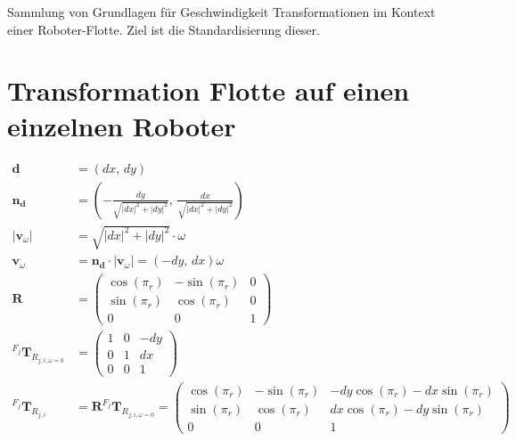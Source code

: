 \documentclass{article}
\newcommand{\Transform}[2]{^{#1}\textbf{T}_{#2}}
\begin{document}
Sammlung von Grundlagen für Geschwindigkeit Transformationen im Kontext einer Roboter-Flotte. Ziel ist die Standardisierung dieser.

\section*{Transformation Flotte auf einen einzelnen Roboter}

\begin{align}
    \textbf{d} &= \left(\mathit{dx},\,\mathit{dy}\right) \\
    \textbf{n}_\textbf{d} &= \left(-\frac{\mathit{dy}}{\sqrt{{\left| \mathit{dx} \right|}^{2} + {\left| \mathit{dy} \right|}^{2}}},\,\frac{\mathit{dx}}{\sqrt{{\left| \mathit{dx} \right|}^{2} + {\left| \mathit{dy} \right|}^{2}}}\right) \\
    \left|\textbf{v}_\omega\right| &= \sqrt{{\left| \mathit{dx} \right|}^{2} + {\left| \mathit{dy} \right|}^{2}} \cdot \omega \\
    \textbf{v}_\omega &= \textbf{n}_\textbf{d} \cdot \left|\textbf{v}_\omega\right| = \left(-\mathit{dy},\,\mathit{dx}\right) \omega \\
    \textbf{R} &= \left(\begin{array}{rrr}
        \cos\left(\pi_{r}\right) & -\sin\left(\pi_{r}\right) & 0 \\
        \sin\left(\pi_{r}\right) & \cos\left(\pi_{r}\right) & 0 \\
        0 & 0 & 1
    \end{array}\right) \\
    \Transform{F_j}{R_{j,i,\omega=0}} &= \left(\begin{array}{rrr}
        1 & 0 & -\mathit{dy} \\
        0 & 1 & \mathit{dx} \\
        0 & 0 & 1
    \end{array}\right) \\
    \Transform{F_j}{R_{j,i}} &= \textbf{R} \Transform{F_j}{R_{j,i,\omega=0}} =
    \left(\begin{array}{rrr}
        \cos\left(\pi_{r}\right) & -\sin\left(\pi_{r}\right) & -\mathit{dy} \cos\left(\pi_{r}\right) - \mathit{dx} \sin\left(\pi_{r}\right) \\
        \sin\left(\pi_{r}\right) & \cos\left(\pi_{r}\right) & \mathit{dx} \cos\left(\pi_{r}\right) - \mathit{dy} \sin\left(\pi_{r}\right) \\
        0 & 0 & 1
    \end{array}\right)
\end{align}


\end{document}
